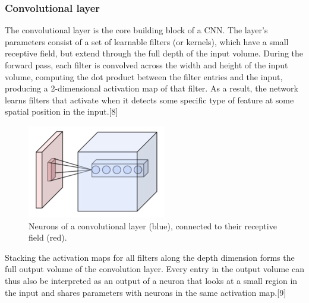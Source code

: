 \documentclass[12pt,a4paper]{article}
\begin{document}
\subsubsection{Convolutional layer}
The convolutional layer is the core building block of a CNN. The layer's parameters consist of a set of learnable filters (or kernels), which have a small receptive field, but extend through the full depth of the input volume. During the forward pass, each filter is convolved across the width and height of the input volume, computing the dot product between the filter entries and the input, producing a 2-dimensional activation map of that filter. As a result, the network learns filters that activate when it detects some specific type of feature at some spatial position in the input.[8]\\ 
\begin{figure}[h]
\centerline{\includegraphics[scale=0.7]{Conv_layer.png}}
\caption{Neurons of a convolutional layer (blue), connected to their receptive field (red).}
\label{fig 8}
\end{figure}
Stacking the activation maps for all filters along the depth dimension forms the full output volume of the convolution layer. Every entry in the output volume can thus also be interpreted as an output of a neuron that looks at a small region in the input and shares parameters with neurons in the same activation map.[9]
\end{document}
